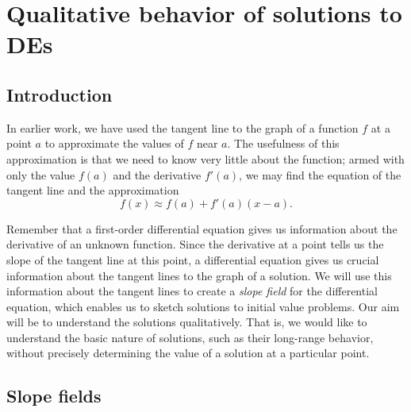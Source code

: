 \section{Qualitative behavior of solutions to DEs} \label{S:7.2.Qualitative}

\vspace*{-14 pt}

\subsection*{Introduction}

In earlier work, we have used the tangent line to the graph of a
function $f$ at a point $a$ to approximate the values of $f$ near $a$.
The usefulness of this approximation is that we need to know very
little about the function; armed with only the value $f(a)$ and the
derivative $f'(a)$, we may find the equation of the tangent line and
the approximation  
$$
f(x) \approx f(a) + f'(a)(x-a).
$$ 

Remember that a first-order differential equation gives us information
about the derivative of an unknown function. 
Since the derivative at a point tells us the slope of the
tangent line at this point, a differential equation
gives us crucial information about the tangent lines to the graph of
a solution.  We will use this information about the tangent lines to
create a \emph{slope field} for the differential equation, which enables
us to sketch solutions to initial value problems.  Our aim will be to
understand the solutions qualitatively.  That is, we would like to
understand the basic nature of solutions, such as their long-range
behavior, without precisely determining the value of a solution at a
particular point.



\subsection*{Slope fields} 

